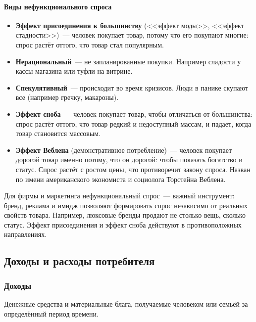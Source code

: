 \documentclass[12pt]{article}
\begin{document}
	\paragraph{Виды нефункционального спроса}
	\begin{itemize}
		\item \textbf{Эффект присоединения к большинству} (<<эффект моды>>, <<эффект стадности>>)~--- человек покупает товар, потому что его покупают многие: спрос растёт оттого, что товар стал популярным.
		\item \textbf{Нерациональный}~--- не запланированные покупки. Например сладости у кассы магазина или туфли на витрине.
		\item \textbf{Спекулятивный}~--- происходит во время кризисов. Люди в панике скупают все (например гречку, макароны).
		\item \textbf{Эффект сноба}~--- человек покупает товар, чтобы отличаться от большинства: спрос растёт оттого, что товар редкий и недоступный массам, и падает, когда товар становится массовым.
		\item \textbf{Эффект Веблена} (демонстративное потребление)~--- человек покупает дорогой товар именно потому, что он дорогой: чтобы показать богатство и статус. Спрос растёт с ростом цены, что противоречит закону спроса. Назван по имени американского экономиста и социолога Торстейна Веблена.
	\end{itemize}
	
	\begin{note}
		Для фирмы и маркетинга нефункциональный спрос~--- важный инструмент: бренд, реклама и имидж позволяют формировать спрос независимо от реальных свойств товара. Например, люксовые бренды продают не столько вещь, сколько статус. Эффект присоединения и эффект сноба действуют в противоположных направлениях.
	\end{note}

	\subsection{Доходы и расходы потребителя}
	
	\subsubsection{Доходы}
	
	\begin{definition}[Доход]
		Денежные средства и материальные блага, получаемые человеком или семьёй за определённый период времени.
	\end{definition}
	
\end{document}

